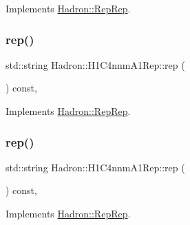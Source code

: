 Implements \mbox{\hyperlink{structHadron_1_1RepRep_ab3213025f6de249f7095892109575fde}{Hadron\+::\+Rep\+Rep}}.

\mbox{\label{structHadron_1_1H1C4nnmA1Rep_a66b6495d208ea091b2e8b5e45bf67c29}} 
\subsubsection{\texorpdfstring{rep()}{rep()}\hspace{0.1cm}{\footnotesize\ttfamily [2/5]}}
{\footnotesize\ttfamily std\+::string Hadron\+::\+H1\+C4nnm\+A1\+Rep\+::rep (\begin{DoxyParamCaption}{ }\end{DoxyParamCaption}) const\hspace{0.3cm}{\ttfamily [inline]}, {\ttfamily [virtual]}}



Implements \mbox{\hyperlink{structHadron_1_1RepRep_ab3213025f6de249f7095892109575fde}{Hadron\+::\+Rep\+Rep}}.

\mbox{\label{structHadron_1_1H1C4nnmA1Rep_a66b6495d208ea091b2e8b5e45bf67c29}} 
\subsubsection{\texorpdfstring{rep()}{rep()}\hspace{0.1cm}{\footnotesize\ttfamily [3/5]}}
{\footnotesize\ttfamily std\+::string Hadron\+::\+H1\+C4nnm\+A1\+Rep\+::rep (\begin{DoxyParamCaption}{ }\end{DoxyParamCaption}) const\hspace{0.3cm}{\ttfamily [inline]}, {\ttfamily [virtual]}}



Implements \mbox{\hyperlink{structHadron_1_1RepRep_ab3213025f6de249f7095892109575fde}{Hadron\+::\+Rep\+Rep}}.

\mbox{\label{structHadron_1_1H1C4nnmA1Rep_a66b6495d208ea091b2e8b5e45bf67c29}} 
